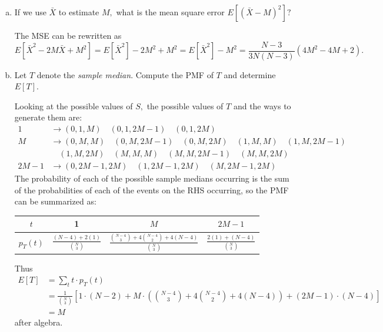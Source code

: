 \documentclass{article}
\begin{document}
\begin{enumerate}
\begin{enumerate}[(a)]
\begin{soln}
				\end{soln}

			\item If we use $\bar{X}$ to estimate $M,$ what is the mean square error $E[(\bar{X}-M)^2]?$
				\begin{soln}
					The MSE can be rewritten as \[E[\bar{X}^2-2M\bar{X}+M^2]=E[\bar{X}^2]-2M^2+M^2=E[\bar{X}^2]-M^2 = \boxed{\frac{N-3}{3N(N-3)}(4M^2-4M+2).} \]
				\end{soln}

			\item Let $T$ denote the \textit{sample median}. Compute the PMF of $T$ and determine $E[T].$
				\begin{soln}
					Looking at the possible values of $S,$ the possible values of $T$ and the ways to generate them are:
					\begin{align*}
						1 &\to (0, 1, M)\quad(0, 1, 2M-1)\quad(0, 1, 2M) \\
						M&\to (0, M, M)\quad(0, M, 2M-1)\quad(0, M, 2M)\quad(1, M, M)\quad(1, M, 2M-1) \\ &\quad(1, M, 2M)\quad(M, M, M)\quad(M, M, 2M-1)\quad(M, M, 2M) \\
						2M-1&\to (0, 2M-1, 2M)\quad (1, 2M-1, 2M)\quad(M, 2M-1, 2M)
					\end{align*}
					The probability of each of the possible sample medians occurring is the sum of the probabilities of each of the events on the RHS occurring, so the PMF can be summarized as:
					\begin{center}
						\begin{tabular}{c||c|c|c}
							$t$ & 1 & $M$ & $2M-1$ \\
							\hline
							$p_T(t)$ & $\displaystyle\frac{(N-4) + 2(1)}{\binom{N}{3}}$ & $\displaystyle\frac{\binom{N-4}{3}+4\binom{N-4}{2}+4(N-4)}{\binom{N}{3}}$ & $\displaystyle\frac{2(1)+(N-4)}{\binom{N}{3}}$
						\end{tabular}
					\end{center}

					Thus
					\begin{align*}
						E[T] &= \sum_{t}^{}t\cdot p_T(t) \\
						&= \frac{1}{\binom{N}{3}} \left[ 1\cdot(N-2)+M\cdot\left( \binom{N-4}{3}+4\binom{N-4}{2}+4(N-4) \right)+ (2M-1)\cdot (N-4) \right] \\
						&= \boxed{M}
					\end{align*} after algebra. 
					
				\end{soln}


\end{enumerate}
\end{enumerate}
\end{document}
